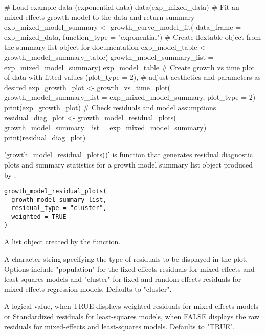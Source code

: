 \documentclass[a4paper]{book}
\begin{document}
%
\begin{Examples}
\begin{ExampleCode}
# Load example data (exponential data)
data(exp_mixed_data)
# Fit an mixed-effects growth model to the data and return summary
exp_mixed_model_summary <- growth_curve_model_fit(
data_frame = exp_mixed_data,
function_type = "exponential")
# Create flextable object from the summary list object for documentation
exp_model_table <- growth_model_summary_table(
growth_model_summary_list = exp_mixed_model_summary)
exp_model_table
# Create growth vs time plot of data with fitted values (plot_type = 2),
# adjust aesthetics and parameters as desired
exp_growth_plot <- growth_vs_time_plot(
growth_model_summary_list = exp_mixed_model_summary,
plot_type = 2)
print(exp_growth_plot)
# Check residuals and model assumptions
residual_diag_plot <- growth_model_residual_plots(
growth_model_summary_list = exp_mixed_model_summary)
print(residual_diag_plot)
\end{ExampleCode}
\end{Examples}
%
\begin{Description}
'growth\_model\_residual\_plots()' is function that generates residual
diagnostic plots and summary statistics for a growth model summary list
object produced by .
\end{Description}
%
\begin{Usage}
\begin{verbatim}
growth_model_residual_plots(
  growth_model_summary_list,
  residual_type = "cluster",
  weighted = TRUE
)
\end{verbatim}
\end{Usage}
%
\begin{Arguments}
\begin{ldescription}
\item[\code{growth\_model\_summary\_list}] A list object created by the
 function.

\item[\code{residual\_type}] A character string specifying the type of residuals
to be displayed in the plot. Options include "population" for the
fixed-effects residuals for mixed-effects and least-squares models and
"cluster" for fixed and random-effects residuals for mixed-effects
regression models. Defaults to "cluster".

\item[\code{weighted}] A logical value, when TRUE displays weighted residuals for
mixed-effects models or Standardized residuals for least-squares models,
when FALSE displays the raw residuals for mixed-effects and least-squares
models. Defaults to "TRUE".
\end{ldescription}
\end{Arguments}
\end{document}

